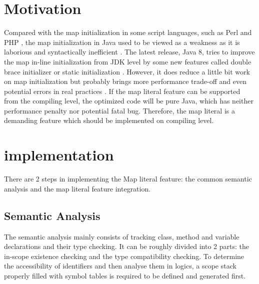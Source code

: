 	
	
	
	\section{Motivation}
	
	Compared with the map initialization in some script languages, such as Perl \cite{Wall} and PHP \cite{Tatroe}, the map initialization in Java used to be viewed as a weakness as it is laborious and syntactically inefficient \cite{Buesing, Minborg}. The latest release, Java 8, tries to improve the map in-line initialization from JDK level by some new features called double brace initializer or static initialization \cite{Arnold, www.c2.com, Minborg, Bansal}. However, it does reduce a little bit work on map initialization but probably brings more performance trade-off and even potential errors in real practices \cite{jOOQ, StackOverFlow}. If the map literal feature can be supported from the compiling level, the optimized code will be pure Java, which has neither performance penalty nor potential fatal bug. Therefore, the map literal is a demanding feature which should be implemented on compiling level. 
	
	\section{implementation}
	
	There are 2 steps in implementing the Map literal feature: the common semantic analysis and the map literal feature integration.
	
	\subsection{Semantic Analysis}
	
	The semantic analysis mainly consists of tracking class, method and variable declarations and their type checking. It can be roughly divided into 2 parts: the in-scope existence checking and the type compatibility checking. To determine the accessibility of identifiers and then analyse them in logics, a scope stack properly filled with symbol tables is required to be defined and generated first.
	
